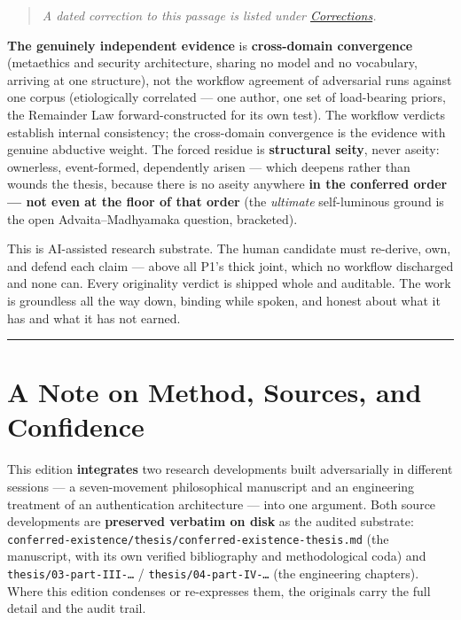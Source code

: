 \documentclass[11pt]{article}
\begin{document}
\begin{quote}\small\emph{A dated correction to this passage is listed under \hyperref[corrections]{Corrections}.}\end{quote}

\textbf{The genuinely independent evidence} is \textbf{cross-domain convergence} (metaethics and security architecture, sharing no model and no vocabulary, arriving at one structure), not the workflow agreement of adversarial runs against one corpus (etiologically correlated — one author, one set of load-bearing priors, the Remainder Law forward-constructed for its own test). The workflow verdicts establish internal consistency; the cross-domain convergence is the evidence with genuine abductive weight. The forced residue is \textbf{structural seity}, never aseity: ownerless, event-formed, dependently arisen — which deepens rather than wounds the thesis, because there is no aseity anywhere \textbf{in the conferred order — not even at the floor of that order} (the \emph{ultimate} self-luminous ground is the open Advaita–Madhyamaka question, bracketed).

This is AI-assisted research substrate. The human candidate must re-derive, own, and defend each claim — above all P1's thick joint, which no workflow discharged and none can. Every originality verdict is shipped whole and auditable. The work is groundless all the way down, binding while spoken, and honest about what it has and what it has not earned.

\medskip\noindent\rule{\linewidth}{0.3pt}\medskip

\section*{A Note on Method, Sources, and Confidence}

This edition \textbf{integrates} two research developments built adversarially in different sessions — a seven-movement philosophical manuscript and an engineering treatment of an authentication architecture — into one argument. Both source developments are \textbf{preserved verbatim on disk} as the audited substrate: \texttt{conferred-existence/thesis/conferred-existence-thesis.md} (the manuscript, with its own verified bibliography and methodological coda) and \texttt{thesis/03-part-III-…} /\allowbreak{} \texttt{thesis/04-part-IV-…} (the engineering chapters). Where this edition condenses or re-expresses them, the originals carry the full detail and the audit trail.
\end{document}
